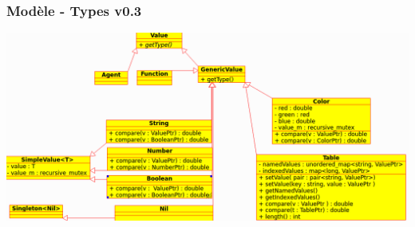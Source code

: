 \begin{frame}
\frametitle{Modèle - Types v0.3}
\centering
\includegraphics[scale=0.21]{doc/Presentation/image/types04.png}
\end{frame}
